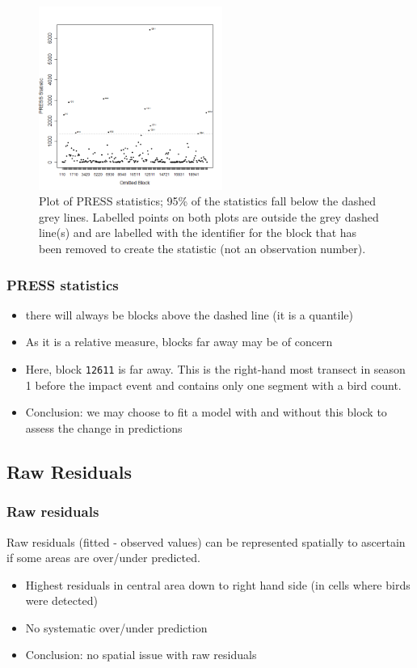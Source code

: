 \begin{frame}[fragile]
\frametitle{}
\begin{figure}[h]
  \centering
    \includegraphics[width=6cm]{InfluenceMeasures_press.png}
  \caption{Plot of PRESS statistics; 95\% of the statistics fall below the dashed grey lines.  Labelled points on both plots are outside the grey dashed line(s) and are labelled with the identifier for the block that has been removed to create the statistic (not an observation number).}
  \label{fig:influence2}
\end{figure}
\end{frame}


\begin{frame}
\frametitle{PRESS statistics}
\begin{itemize}
  \item there will always be blocks above the dashed line (it is a quantile)
  \item As it is a relative measure, blocks far away may be of concern
  \item Here, block {\tt 12611} is far away.  This is the right-hand most transect in season 1 before the impact event and contains only one segment with a bird count.
  \pause
  \bigskip
  \item Conclusion: we may choose to fit a model with and without this block to assess the change in predictions
\end{itemize}
\end{frame}

\subsection{Raw Residuals}
\begin{frame}[fragile]
\frametitle{Raw residuals}

Raw residuals (fitted - observed values) can be represented spatially to ascertain if some areas are over/under predicted.  

\begin{itemize}
\item Highest residuals in central area down to right hand side (in cells where birds were detected)
\item No systematic over/under prediction
\bigskip
\item Conclusion: no spatial issue with raw residuals
\end{itemize}
\end{frame}


